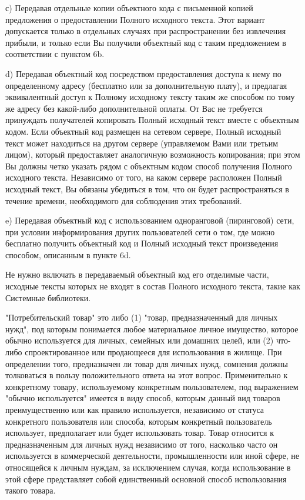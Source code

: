 с) Передавая отдельные копии объектного кода с письменной копией предложения о предоставлении Полного исходного текста. Этот вариант допускается только в отдельных случаях при распространении без извлечения прибыли, и только если Вы получили объектный код с таким предложением в соответствии с пунктом 6b.

d) Передавая объектный код посредством предоставления доступа к нему по определенному адресу (бесплатно или за дополнительную плату), и предлагая эквивалентный доступ к Полному исходному тексту таким же способом по тому же адресу без какой-\/либо дополнительной оплаты. От Вас не требуется принуждать получателей копировать Полный исходный текст вместе с объектным кодом. Если объектный код размещен на сетевом сервере, Полный исходный текст может находиться на другом сервере (управляемом Вами или третьим лицом), который предоставляет аналогичную возможность копирования; при этом Вы должны четко указать рядом с объектным кодом способ получения Полного исходного текста. Независимо от того, на каком сервере расположен Полный исходный текст, Вы обязаны убедиться в том, что он будет распространяться в течение времени, необходимого для соблюдения этих требований.

e) Передавая объектный код с использованием одноранговой (пиринговой) сети, при условии информирования других пользователей сети о том, где можно бесплатно получить объектный код и Полный исходный текст произведения способом, описанным в пункте 6d.

Не нужно включать в передаваемый объектный код его отделимые части, исходные тексты которых не входят в состав Полного исходного текста, такие как Системные библиотеки.

"{}Потребительский товар"{} это либо (1) "{}товар, предназначенный для личных нужд"{}, под которым понимается любое материальное личное имущество, которое обычно используется для личных, семейных или домашних целей, или (2) что-\/либо спроектированное или продающееся для использования в жилище. При определении того, предназначен ли товар для личных нужд, сомнения должны толковаться в пользу положительного ответа на этот вопрос. Применительно к конкретному товару, используемому конкретным пользователем, под выражением "{}обычно используется"{} имеется в виду способ, которым данный вид товаров преимущественно или как правило используется, независимо от статуса конкретного пользователя или способа, которым конкретный пользователь использует, предполагает или будет использовать товар. Товар относится к предназначенным для личных нужд независимо от того, насколько часто он используется в коммерческой деятельности, промышленности или иной сфере, не относящейся к личным нуждам, за исключением случая, когда использование в этой сфере представляет собой единственный основной способ использования такого товара.

